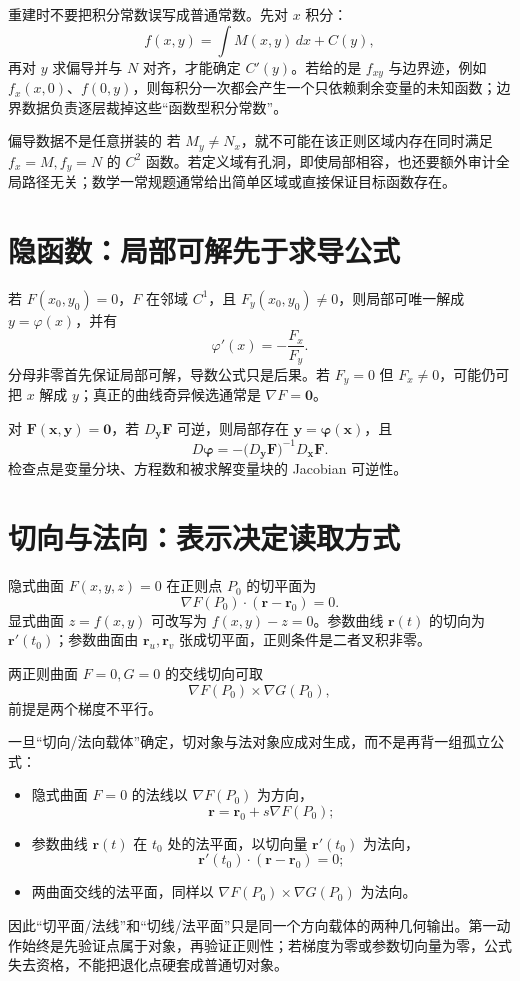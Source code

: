 \documentclass[11pt,a4paper,fontset=fandol]{ctexart}
\begin{document}
重建时不要把积分常数误写成普通常数。先对 $x$ 积分：
\[
f(x,y)=\int M(x,y)\,dx+C(y),
\]
再对 $y$ 求偏导并与 $N$ 对齐，才能确定 $C'(y)$。若给的是 $f_{xy}$ 与边界迹，例如 $f_x(x,0)$、$f(0,y)$，则每积分一次都会产生一个只依赖剩余变量的未知函数；边界数据负责逐层裁掉这些“函数型积分常数”。

\begin{warnbox}{偏导数据不是任意拼装的}
若 $M_y\ne N_x$，就不可能在该正则区域内存在同时满足 $f_x=M,f_y=N$ 的 $C^2$ 函数。若定义域有孔洞，即使局部相容，也还要额外审计全局路径无关；数学一常规题通常给出简单区域或直接保证目标函数存在。
\end{warnbox}

\section{隐函数：局部可解先于求导公式}

若 $F(x_0,y_0)=0$，$F$ 在邻域 $C^1$，且 $F_y(x_0,y_0)\ne0$，则局部可唯一解成 $y=\varphi(x)$，并有
\[
\varphi'(x)=-\frac{F_x}{F_y}.
\]
分母非零首先保证局部可解，导数公式只是后果。若 $F_y=0$ 但 $F_x\ne0$，可能仍可把 $x$ 解成 $y$；真正的曲线奇异候选通常是 $\nabla F=\mathbf0$。

对 $\mathbf F(\mathbf x,\mathbf y)=\mathbf0$，若 $D_{\mathbf y}\mathbf F$ 可逆，则局部存在 $\mathbf y=\boldsymbol\varphi(\mathbf x)$，且
\[
D\boldsymbol\varphi
=-{\bigl(D_{\mathbf y}\mathbf F\bigr)}^{-1}D_{\mathbf x}\mathbf F.
\]
检查点是变量分块、方程数和被求解变量块的 Jacobian 可逆性。

\section{切向与法向：表示决定读取方式}

隐式曲面 $F(x,y,z)=0$ 在正则点 $P_0$ 的切平面为
\[
\nabla F(P_0)\cdot(\mathbf r-\mathbf r_0)=0.
\]
显式曲面 $z=f(x,y)$ 可改写为 $f(x,y)-z=0$。参数曲线 $\mathbf r(t)$ 的切向为 $\mathbf r'(t_0)$；参数曲面由 $\mathbf r_u,\mathbf r_v$ 张成切平面，正则条件是二者叉积非零。

两正则曲面 $F=0,G=0$ 的交线切向可取
\[
\nabla F(P_0)\times\nabla G(P_0),
\]
前提是两个梯度不平行。

一旦“切向/法向载体”确定，切对象与法对象应成对生成，而不是再背一组孤立公式：
\begin{itemize}
  \item 隐式曲面 $F=0$ 的法线以 $\nabla F(P_0)$ 为方向，
  \[
  \mathbf r=\mathbf r_0+s\nabla F(P_0);
  \]
  \item 参数曲线 $\mathbf r(t)$ 在 $t_0$ 处的法平面，以切向量 $\mathbf r'(t_0)$ 为法向，
  \[
  \mathbf r'(t_0)\cdot(\mathbf r-\mathbf r_0)=0;
  \]
  \item 两曲面交线的法平面，同样以 $\nabla F(P_0)\times\nabla G(P_0)$ 为法向。
\end{itemize}
因此“切平面/法线”和“切线/法平面”只是同一个方向载体的两种几何输出。第一动作始终是先验证点属于对象，再验证正则性；若梯度为零或参数切向量为零，公式失去资格，不能把退化点硬套成普通切对象。
\end{document}
